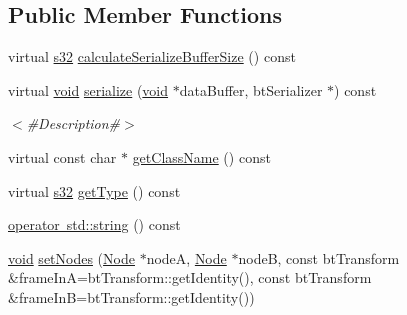 \subsection*{Public Member Functions}
\begin{DoxyCompactItemize}
\item 
virtual \mbox{\hyperlink{_util_8h_aa62c75d314a0d1f37f79c4b73b2292e2}{s32}} \mbox{\hyperlink{classnjli_1_1_physics_constraint_fixed_a6be6f7a7df09a3602a0f4606729420d6}{calculate\+Serialize\+Buffer\+Size}} () const
\item 
virtual \mbox{\hyperlink{_thread_8h_af1e856da2e658414cb2456cb6f7ebc66}{void}} \mbox{\hyperlink{classnjli_1_1_physics_constraint_fixed_a36b23b6b62b01e82724b71bc02e5c887}{serialize}} (\mbox{\hyperlink{_thread_8h_af1e856da2e658414cb2456cb6f7ebc66}{void}} $\ast$data\+Buffer, bt\+Serializer $\ast$) const
\begin{DoxyCompactList}\small\item\em $<$\#\+Description\#$>$ \end{DoxyCompactList}\item 
virtual const char $\ast$ \mbox{\hyperlink{classnjli_1_1_physics_constraint_fixed_ae6b9c4224d1dcc599a396385664b0ba0}{get\+Class\+Name}} () const
\item 
virtual \mbox{\hyperlink{_util_8h_aa62c75d314a0d1f37f79c4b73b2292e2}{s32}} \mbox{\hyperlink{classnjli_1_1_physics_constraint_fixed_a15e1155bd37763d3e7d012bcb12a4d26}{get\+Type}} () const
\item 
\mbox{\hyperlink{classnjli_1_1_physics_constraint_fixed_aa13ea9efcf150050fc58b2d68045dae1}{operator std\+::string}} () const
\item 
\mbox{\hyperlink{_thread_8h_af1e856da2e658414cb2456cb6f7ebc66}{void}} \mbox{\hyperlink{classnjli_1_1_physics_constraint_fixed_a9c2e500b265b2e050ff26183ac739224}{set\+Nodes}} (\mbox{\hyperlink{classnjli_1_1_node}{Node}} $\ast$nodeA, \mbox{\hyperlink{classnjli_1_1_node}{Node}} $\ast$nodeB, const bt\+Transform \&frame\+InA=bt\+Transform\+::get\+Identity(), const bt\+Transform \&frame\+InB=bt\+Transform\+::get\+Identity())
\end{DoxyCompactItemize}
